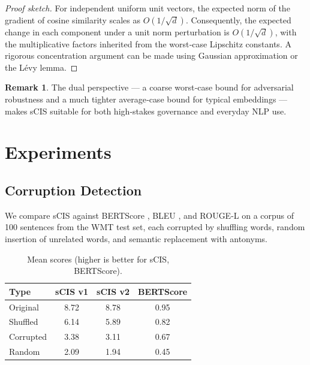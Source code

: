 \documentclass[11pt]{article}
\theoremstyle{definition}
\newtheorem{remark}[theorem]{Remark}
\begin{document}
\begin{proof}[Proof sketch]
For independent uniform unit vectors, the expected norm of the gradient of cosine similarity scales as \(O(1/\sqrt{d})\). Consequently, the expected change in each component under a unit norm perturbation is \(O(1/\sqrt{d})\), with the multiplicative factors inherited from the worst‑case Lipschitz constants. A rigorous concentration argument can be made using Gaussian approximation or the Lévy lemma.
\end{proof}

\begin{remark}
The dual perspective — a coarse worst‑case bound for adversarial robustness and a much tighter average‑case bound for typical embeddings — makes sCIS suitable for both high‑stakes governance and everyday NLP use.
\end{remark}

\section{Experiments}

\subsection{Corruption Detection}
We compare sCIS against BERTScore \cite{bertscore}, BLEU \cite{bleu}, and ROUGE-L \cite{lin2004rouge} on a corpus of 100 sentences from the WMT test set, each corrupted by shuffling words, random insertion of unrelated words, and semantic replacement with antonyms.

\begin{table}[htbp]
\centering
\caption{Mean scores (higher is better for sCIS, BERTScore).}
\begin{tabular}{lccc}
\toprule
Type & sCIS v1 & sCIS v2 & BERTScore \\
\midrule
Original & 8.72 & 8.78 & 0.95 \\
Shuffled & 6.14 & 5.89 & 0.82 \\
Corrupted & 3.38 & 3.11 & 0.67 \\
Random & 2.09 & 1.94 & 0.45 \\
\bottomrule
\end{tabular}
\end{table}
\end{document}

